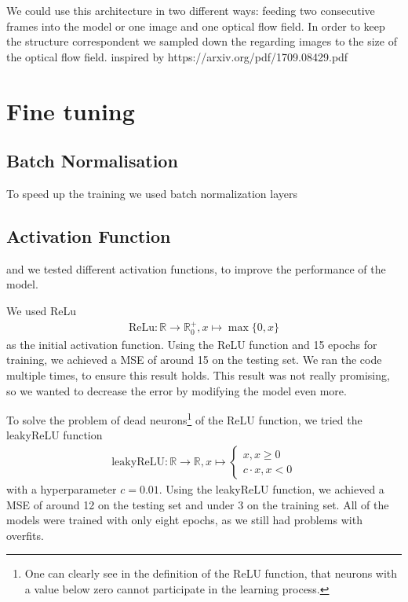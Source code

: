 \documentclass[conference]{IEEEtran}
\begin{document}
We could use this architecture in two different ways: feeding two consecutive frames into the model or one image and one optical flow field. In order to keep the structure correspondent we sampled down the regarding images to the size of the optical flow field. inspired by https://arxiv.org/pdf/1709.08429.pdf

\section{Fine tuning}

\subsection{Batch Normalisation}

To speed up the training we used batch normalization layers \cite{BatchNorm2015} 

\subsection{Activation Function}
and we tested different activation functions, to improve the performance of the model. 

We used ReLu
\begin{align*}
\mathrm{ReLu}: \mathbb{R} \to \mathbb{R}_0^+, x \mapsto \max\{0,x\}
\end{align*}
as the initial activation function. Using the ReLU function and 15 epochs for training, we achieved a MSE of around 15 on the 
testing set. We ran the 
code multiple times, to ensure this result holds. This result was not really promising, so we wanted to decrease the error by 
modifying the model even more.

To solve the problem of dead neurons\footnote{One can clearly see in the definition of the ReLU 
function, that neurons with a value below zero cannot participate in the learning process.} of the ReLU function, we 
tried the leakyReLU function
\begin{align*}
\mathrm{leakyReLU} : \mathbb{R} \to \mathbb{R}, x \mapsto \begin{cases}
x, x \geq 0\\
c \cdot x, x <0
\end{cases}
\end{align*}
with a hyperparameter $c = 0.01$. Using the leakyReLU function, we achieved a MSE of around 12 on the testing set and under 3 on the 
training set. All of the models were trained with only eight epochs, as we still had problems with overfits.
\end{document}
